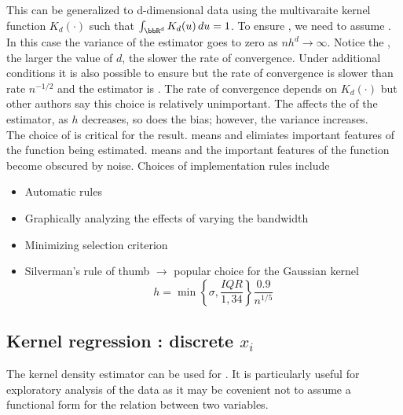 This can be generalized to d-dimensional data using the multivaraite kernel function $K_d(\cdot)$ such that $\int_{\bbR^d}K_d(u)\,du=1$.
To ensure , we need to assume .
In this case the variance of the estimator goes to zero as $nh^d\to\infty$.
Notice the , the larger the value of $d$, the slower the rate of convergence.
Under additional conditions it is also possible to ensure  but the rate of convergence is slower than rate $n^{-1/2}$ and the estimator is .
The rate of convergence depends on $K_d(\cdot)$ but other authors say this choice is relatively unimportant.
The  affects the  of the estimator, as $h$ decreases, so does the bias; however, the variance increases.\\

The choice of  is critical for the result.
 means  and elimiates important features of the function being estimated.
 means  and the important features of the function become obscured by noise.
Choices of implementation rules include
\begin{itemize}
    \item Automatic rules
    \item Graphically analyzing the effects of varying the bandwidth
    \item Minimizing selection criterion
    \item Silverman's rule of thumb $\to$ popular choice for the Gaussian kernel 
    \begin{equation*}
        h = \min\left\{\sigma,\frac{IQR}{1,34}\right\}\frac{0.9}{n^{1/5}}
    \end{equation*}
\end{itemize}

\subsection{Kernel regression : discrete $x_i$}

The kernel density estimator can be used for .
It is particularly useful for exploratory analysis of the data as it may be covenient not to assume a functional form for the relation between two variables.\\

